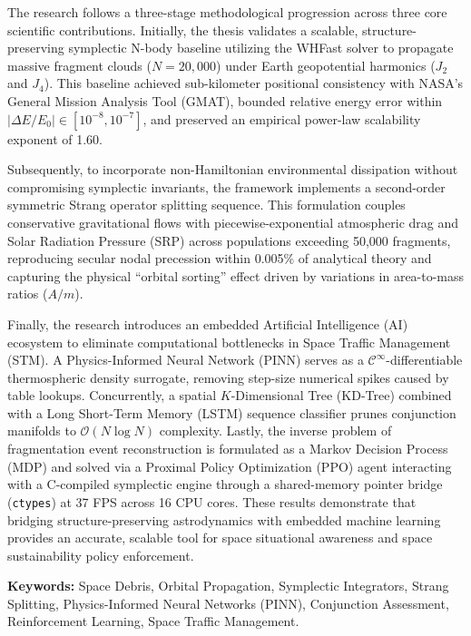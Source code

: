 \documentclass[12pt,letterpaper,twoside]{book}
\begin{document}
The research follows a three-stage methodological progression across three core scientific contributions. Initially, the thesis validates a scalable, structure-preserving symplectic N-body baseline utilizing the WHFast solver to propagate massive fragment clouds ($N = 20,000$) under Earth geopotential harmonics ($J_2$ and $J_4$). This baseline achieved sub-kilometer positional consistency with NASA's General Mission Analysis Tool (GMAT), bounded relative energy error within $|\Delta E/E_0| \in [10^{-8}, 10^{-7}]$, and preserved an empirical power-law scalability exponent of 1.60. 

Subsequently, to incorporate non-Hamiltonian environmental dissipation without compromising symplectic invariants, the framework implements a second-order symmetric Strang operator splitting sequence. This formulation couples conservative gravitational flows with piecewise-exponential atmospheric drag and Solar Radiation Pressure (SRP) across populations exceeding 50,000 fragments, reproducing secular nodal precession within 0.005\% of analytical theory and capturing the physical ``orbital sorting'' effect driven by variations in area-to-mass ratios ($A/m$).

Finally, the research introduces an embedded Artificial Intelligence (AI) ecosystem to eliminate computational bottlenecks in Space Traffic Management (STM). A Physics-Informed Neural Network (PINN) serves as a $\mathcal{C}^\infty$-differentiable thermospheric density surrogate, removing step-size numerical spikes caused by table lookups. Concurrently, a spatial $K$-Dimensional Tree (KD-Tree) combined with a Long Short-Term Memory (LSTM) sequence classifier prunes conjunction manifolds to $\mathcal{O}(N \log N)$ complexity. Lastly, the inverse problem of fragmentation event reconstruction is formulated as a Markov Decision Process (MDP) and solved via a Proximal Policy Optimization (PPO) agent interacting with a C-compiled symplectic engine through a shared-memory pointer bridge (\texttt{ctypes}) at 37 FPS across 16 CPU cores. These results demonstrate that bridging structure-preserving astrodynamics with embedded machine learning provides an accurate, scalable tool for space situational awareness and space sustainability policy enforcement.

\vspace{0.8cm}
\noindent\textbf{Keywords:} Space Debris, Orbital Propagation, Symplectic Integrators, Strang Splitting, Physics-Informed Neural Networks (PINN), Conjunction Assessment, Reinforcement Learning, Space Traffic Management.
\end{document}
